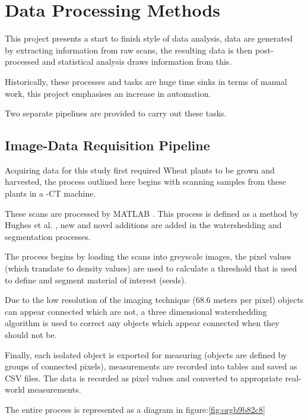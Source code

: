 \documentclass[11pt]{report}
\begin{document}
\section{Data Processing Methods}
\label{sec:orga57f650}
This project presents a start to finish style of data analysis, data are generated by extracting information from raw scans, the resulting data is then post-processed and statistical analysis draws information from this.

Historically, these processes and tasks are huge time sinks in terms of manual work, this project emphasises an increase in automation.

Two separate pipelines are provided to carry out these tasks.

\subsection{Image-Data Requisition Pipeline}
\label{sec:orge9c4788}

Acquiring data for this study first required Wheat plants to be grown and harvested, the process outlined here begins with scanning samples from these plants in a \textmu{}-CT machine.

These scans are processed by MATLAB \cite{MATHWORKS2017}. This process is defined as a method by Hughes et al. \cite{Hughes2017}, new and novel additions are added in the watershedding and segmentation processes.

The process begins by loading the scans into greyscale images, the pixel values (which translate to density values) are used to calculate a threshold that is used to define and segment material of interest (seeds).

Due to the low resolution of the imaging technique (68.6\textmu{} meters per pixel) objects can appear connected which are not, a three dimensional watershedding algorithm is used to correct any objects which appear connected when they should not be.

Finally, each isolated object is exported for measuring (objects are defined by groups of connected pixels), measurements are recorded into tables and saved as CSV files. The data is recorded as pixel values and converted to appropriate real-world measurements.

The entire process is represented as a diagram in figure:\ref{fig:orgb9b82c8}
\end{document}
